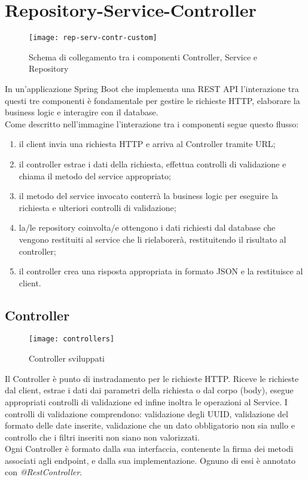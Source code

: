 \section{Repository-Service-Controller}

\begin{figure}[H] 
    \centering 
    \texttt{[image: rep-serv-contr-custom]} 
    \caption{Schema di collegamento tra i componenti Controller, Service e Repository}
\end{figure}

\noindent In un'applicazione Spring Boot che implementa una REST API l'interazione tra questi tre componenti è fondamentale per gestire le richieste HTTP, elaborare la business logic e interagire con il database.\\
Come descritto nell'immagine l'interazione tra i componenti segue questo flusso:
\begin{enumerate}
\item il client invia una richiesta HTTP e arriva al Controller tramite URL;
\item il controller estrae i dati della richiesta, effettua controlli di validazione e chiama il metodo del service appropriato;
\item il metodo del service invocato conterrà la business logic per eseguire la richiesta e ulteriori controlli di validazione;
\item la/le repository coinvolta/e ottengono i dati richiesti dal database che vengono restituiti al service che li rielaborerà, restituitendo il risultato al controller;
\item il controller crea una risposta appropriata in formato JSON e la restituisce al client.
\end{enumerate}

\subsection{Controller}
\begin{figure}[H] 
    \centering 
    \texttt{[image: controllers]} 
    \caption{Controller sviluppati}
\end{figure}
Il Controller è punto di instradamento per le richieste HTTP. Riceve le richieste dal client, estrae i dati dai parametri della richiesta o dal corpo (body), esegue appropriati controlli di validazione ed infine inoltra le operazioni al Service. I controlli di validazione comprendono: validazione degli UUID, validazione del formato delle date inserite, validazione che un dato obbligatorio non sia nullo e controllo che i filtri inseriti non siano non valorizzati.\\
Ogni Controller è formato dalla sua interfaccia, contenente la firma dei metodi associati agli endpoint, e dalla sua implementazione. Ognuno di essi è annotato con \textit{@RestController}.

